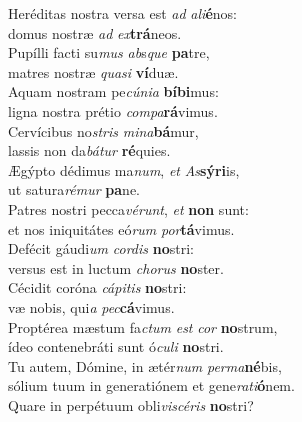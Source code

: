 \evenverse Heréditas nostra versa est \textit{ad} \textit{a}\textit{li}\textbf{é}nos:~\*\\
\evenverse domus nostræ \textit{ad} \textit{ex}\textbf{trá}neos.\\
\oddverse Pupílli facti su\textit{mus} \textit{ab}s\textit{que} \textbf{pa}tre,~\*\\
\oddverse matres nostræ \textit{qua}\textit{si} \textbf{ví}duæ.\\
\evenverse Aquam nostram pe\textit{cú}\textit{ni}\textit{a} \textbf{bí}\textbf{bi}mus:~\*\\
\evenverse ligna nostra prétio \textit{com}\textit{pa}\textbf{rá}vimus.\\
\oddverse Cervícibus no\textit{stris} \textit{mi}\textit{na}\textbf{bá}mur,~\*\\
\oddverse lassis non da\textit{bá}\textit{tur} \textbf{ré}quies.\\
\evenverse Ægýpto dédimus ma\textit{num}, \textit{et} \textit{As}\textbf{sý}\textbf{ri}is,~\*\\
\evenverse ut satura\textit{ré}\textit{mur} \textbf{pa}ne.\\
\oddverse Patres nostri pecca\textit{vé}\textit{runt}, \textit{et} \textbf{non} sunt:~\*\\
\oddverse et nos iniquitátes eó\textit{rum} \textit{por}\textbf{tá}vimus.\\
\evenverse Defécit gáudi\textit{um} \textit{cor}\textit{dis} \textbf{no}stri:~\*\\
\evenverse versus est in luctum \textit{cho}\textit{rus} \textbf{no}ster.\\
\oddverse Cécidit coróna \textit{cá}\textit{pi}\textit{tis} \textbf{no}stri:~\*\\
\oddverse væ nobis, qui\textit{a} \textit{pec}\textbf{cá}vimus.\\
\evenverse Proptérea mæstum fa\textit{ctum} \textit{est} \textit{cor} \textbf{no}strum,~\*\\
\evenverse ídeo contenebráti sunt ó\textit{cu}\textit{li} \textbf{no}stri.\\
\oddverse Tu autem, Dómine, in ætér\textit{num} \textit{per}\textit{ma}\textbf{né}bis,~\*\\
\oddverse sólium tuum in generatiónem et gene\textit{ra}\textit{ti}\textbf{ó}nem.\\
\evenverse Quare in perpétuum obli\textit{vi}\textit{scé}\textit{ris} \textbf{no}stri?~\*\\
